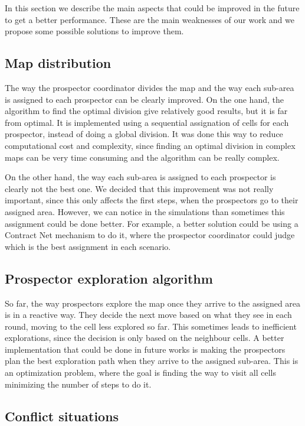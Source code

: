 In this section we describe the main aspects that could be improved in the future to get a better performance. These are the main weaknesses of our work and we propose some possible solutions to improve them. 

\subsection{Map distribution}

The way the prospector coordinator divides the map and the way each sub-area is assigned to each prospector can be clearly improved. On the one hand, the algorithm to find the optimal division give relatively good results, but it is far from optimal. It is implemented using a sequential assignation of cells for each prospector, instead of doing a global division. It was done this way to reduce computational cost and complexity, since finding an optimal division in complex maps can be very time consuming and the algorithm can be really complex. 

On the other hand, the way each sub-area is assigned to each prospector is clearly not the best one. We decided that this improvement was not really important, since this only affects the first steps, when the prospectors go to their assigned area. However, we can notice in the simulations than sometimes this assignment could be done better. For example, a better solution could be using a Contract Net mechanism to do it, where the prospector coordinator could judge which is the best assignment in each scenario.

\subsection{Prospector exploration algorithm}

So far, the way prospectors explore the map once they arrive to the assigned area is in a reactive way. They decide the next move based on what they see in each round, moving to the cell less explored so far. This sometimes leads to inefficient explorations, since the decision is only based on the neighbour cells. A better implementation that could be done in future works is making the prospectors plan the best exploration path when they arrive to the assigned sub-area. This is an optimization problem, where the goal is finding the way to visit all cells minimizing the number of steps to do it. 

\subsection{Conflict situations}

